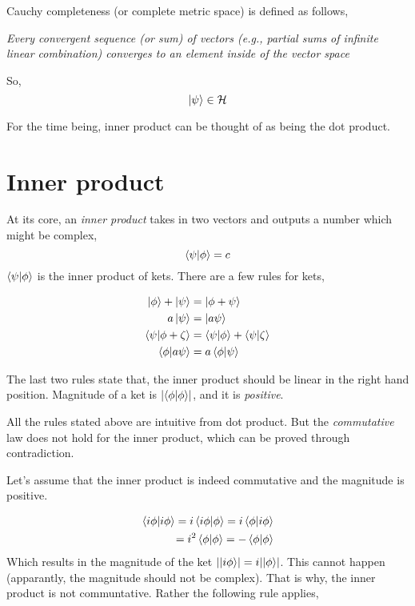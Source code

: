 	\noindent Cauchy completeness (or complete metric space) is defined as follows,

	\begin{center}
		\emph{Every convergent sequence (or sum) of vectors (e.g., partial sums
		of infinite linear combination) converges to an element inside of the
		vector space}
	\end{center}

	\noindent So,
	\begin{equation}
		\ket{\psi} \in \mathcal{H}
		\label{eq:5}
	\end{equation}

	\noindent For the time being, inner product can be thought of as being the dot
	product.

	\section{Inner product}
	\noindent At its core, an \emph{inner product} takes in two vectors and outputs
	a number which might be complex,
	\begin{equation}
		\left\langle \psi \vert \phi \right\rangle = c\notag
	\end{equation}
	\noindent $ \left\langle \psi \vert \phi \right\rangle $ is the inner product of kets. There are
	a few rules for kets,
	
	\begin{align*}
	\begin{split}
		\ket{\phi} + \ket{\psi} &= \ket{\phi + \psi} \\
		a \ket{\psi} &= \ket{a \psi} \\
		\left\langle \psi \vert \phi + \zeta \right\rangle &= \left\langle \psi \vert \phi \right\rangle + \left\langle \psi \vert \zeta \right\rangle \\
		\left\langle \phi \vert a \psi \right\rangle &= a \left\langle \phi \vert \psi \right\rangle 
	\end{split}
	\end{align*}

	\noindent The last two rules state that, the inner product should be linear in the
	right hand position. Magnitude of a ket is $ \abs{\left\langle \phi \vert \phi \right\rangle} $, and it is
	\emph{positive}.

	\noindent All the rules stated above are intuitive from dot product. But
	the \emph{commutative} law does not hold for the inner product, which can be proved
	through contradiction. 

	\noindent Let's assume that the inner product is indeed commutative and the magnitude
	is positive.
	
	\begin{align*}
		\left\langle i\phi \vert i\phi \right\rangle = i\left\langle i\phi \vert \phi \right\rangle = i\left\langle \phi \vert i\phi \right\rangle \\
			= i^2 \left\langle \phi \vert \phi \right\rangle = - \left\langle \phi \vert \phi \right\rangle
	\end{align*}
	\noindent Which results in the magnitude of the ket $ \abs{\ket{i \phi}} = i \abs{\ket{\phi}} $. This
	cannot happen (apparantly, the magnitude should not be complex). That is why, the
	inner product is not communtative. Rather the following rule applies,

